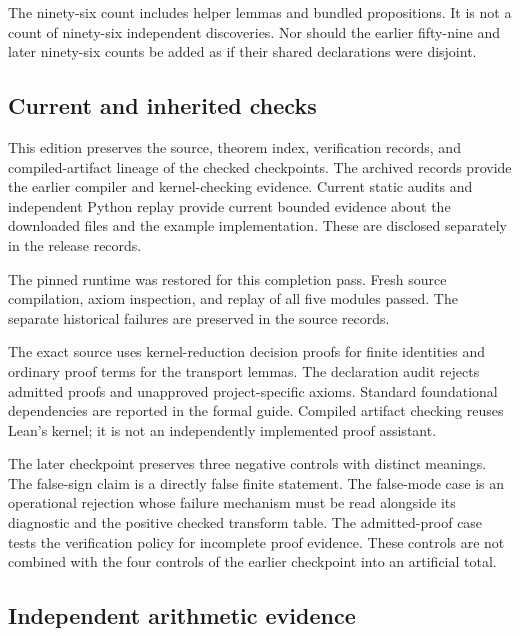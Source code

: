 The ninety-six count includes helper lemmas and bundled propositions. It
is not a count of ninety-six independent discoveries. Nor should the
earlier fifty-nine and later ninety-six counts be added as if their
shared declarations were disjoint.

\hypertarget{q:current-and-inherited-checks}{%
\subsection{Current and inherited
checks}\label{q:current-and-inherited-checks}}

This edition preserves the source, theorem index, verification records,
and compiled-artifact lineage of the checked checkpoints. The archived
records provide the earlier compiler and kernel-checking evidence.
Current static audits and independent Python replay provide current
bounded evidence about the downloaded files and the example
implementation. These are disclosed separately in the release records.

The pinned runtime was restored for this completion pass. Fresh source compilation, axiom inspection, and replay of all five modules passed. The separate historical failures are preserved in the source records.

The exact source uses kernel-reduction decision proofs for finite
identities and ordinary proof terms for the transport lemmas. The
declaration audit rejects admitted proofs and unapproved
project-specific axioms. Standard foundational dependencies are reported
in the formal guide. Compiled artifact checking reuses Lean's kernel; it
is not an independently implemented proof assistant.

The later checkpoint preserves three negative controls with distinct
meanings. The false-sign claim is a directly false finite statement. The
false-mode case is an operational rejection whose failure mechanism must
be read alongside its diagnostic and the positive checked transform
table. The admitted-proof case tests the verification policy for
incomplete proof evidence. These controls are not combined with the four
controls of the earlier checkpoint into an artificial total.

\hypertarget{q:independent-arithmetic-evidence}{%
\subsection{Independent arithmetic
evidence}\label{q:independent-arithmetic-evidence}}

